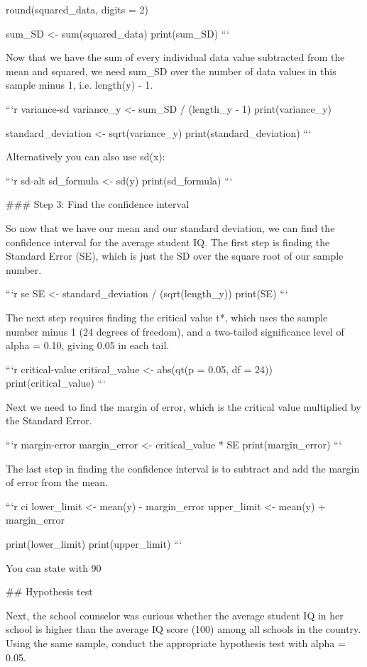 round(squared_data, digits = 2)

sum_SD <- sum(squared_data)
print(sum_SD)
```

Now that we have the sum of every individual data value subtracted from the mean and squared, we need sum_SD over the number of data values in this sample minus 1, i.e. length(y) - 1.

```{r variance-sd}
variance_y <- sum_SD / (length_y - 1)
print(variance_y)

standard_deviation <- sqrt(variance_y)
print(standard_deviation)
```

Alternatively you can also use sd(x):

```{r sd-alt}
sd_formula <- sd(y)
print(sd_formula)
```

### Step 3: Find the confidence interval

So now that we have our mean and our standard deviation, we can find the confidence interval for the average student IQ. The first step is finding the Standard Error (SE), which is just the SD over the square root of our sample number.

```{r se}
SE <- standard_deviation / (sqrt(length_y))
print(SE)
```

The next step requires finding the critical value t*, which uses the sample number minus 1 (24 degrees of freedom), and a two-tailed significance level of alpha = 0.10, giving 0.05 in each tail.

```{r critical-value}
critical_value <- abs(qt(p = 0.05, df = 24))
print(critical_value)
```

Next we need to find the margin of error, which is the critical value multiplied by the Standard Error.

```{r margin-error}
margin_error <- critical_value * SE
print(margin_error)
```

The last step in finding the confidence interval is to subtract and add the margin of error from the mean.

```{r ci}
lower_limit <- mean(y) - margin_error
upper_limit <- mean(y) + margin_error

print(lower_limit)
print(upper_limit)
```

You can state with 90%

## Hypothesis test

Next, the school counselor was curious whether the average student IQ in her school is higher than the average IQ score (100) among all schools in the country. Using the same sample, conduct the appropriate hypothesis test with alpha = 0.05.


